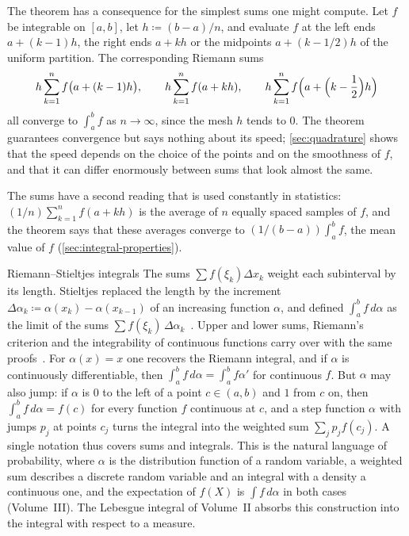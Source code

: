 The theorem has a consequence for the simplest sums one might compute. Let $f$ be integrable on $[a,b]$, let $h\coloneqq(b-a)/n$, and evaluate $f$ at the left ends $a+(k-1)h$, the right ends $a+kh$ or the midpoints $a+(k-1/2)h$ of the uniform partition. The corresponding Riemann sums
\[
h\sum_{k=1}^nf\bigl(a+(k-1)h\bigr),\qquad h\sum_{k=1}^nf(a+kh),\qquad h\sum_{k=1}^nf\Bigl(a+\Bigl(k-\frac12\Bigr)h\Bigr)
\]
all converge to $\int_a^bf$ as $n\to\infty$, since the mesh $h$ tends to $0$. The theorem guarantees convergence but says nothing about its speed; \cref{sec:quadrature} shows that the speed depends on the choice of the points and on the smoothness of $f$, and that it can differ enormously between sums that look almost the same.

The sums have a second reading that is used constantly in statistics: $(1/n)\sum_{k=1}^nf(a+kh)$ is the average of $n$ equally spaced samples of $f$, and the theorem says that these averages converge to $(1/(b-a))\int_a^bf$, the mean value of $f$ (\cref{sec:integral-properties}).

\begin{note}{Riemann--Stieltjes integrals}
The sums $\sum f(\xi_k)\Delta x_k$ weight each subinterval by its length. Stieltjes replaced the length by the increment $\Delta\alpha_k\coloneqq\alpha(x_k)-\alpha(x_{k-1})$ of an increasing function $\alpha$, and defined $\int_a^bf\,d\alpha$ as the limit of the sums $\sum f(\xi_k)\,\Delta\alpha_k$~\cite{stieltjes1894}. Upper and lower sums, Riemann's criterion and the integrability of continuous functions carry over with the same proofs~\cite{rudin1976}. For $\alpha(x)=x$ one recovers the Riemann integral, and if $\alpha$ is continuously differentiable, then $\int_a^bf\,d\alpha=\int_a^bf\alpha'$ for continuous $f$. But $\alpha$ may also jump: if $\alpha$ is $0$ to the left of a point $c\in(a,b)$ and $1$ from $c$ on, then $\int_a^bf\,d\alpha=f(c)$ for every function $f$ continuous at $c$, and a step function $\alpha$ with jumps $p_j$ at points $c_j$ turns the integral into the weighted sum $\sum_jp_jf(c_j)$. A single notation thus covers sums and integrals. This is the natural language of probability, where $\alpha$ is the distribution function of a random variable, a weighted sum describes a discrete random variable and an integral with a density a continuous one, and the expectation of $f(X)$ is $\int f\,d\alpha$ in both cases (Volume~III). The Lebesgue integral of Volume~II absorbs this construction into the integral with respect to a measure.
\end{note}

